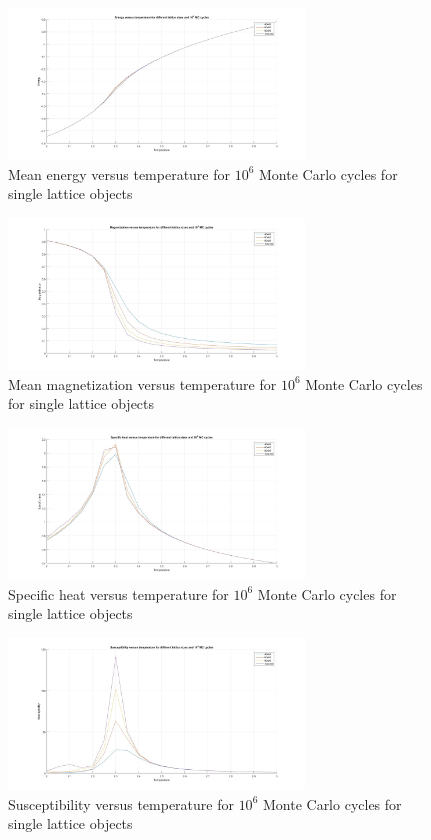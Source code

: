 \documentclass[10pt,a4paper]{article}
\begin{document}
\begin{figure}[H]
\centerline{
\includegraphics[width=0.7\textwidth]{energyVSt}
}
\caption{Mean energy versus temperature for $10^6$ Monte Carlo cycles for single lattice objects}
\label{fig:energyVSt}
\end{figure}

\begin{figure}[H]
\centerline{
\includegraphics[width=0.7\textwidth]{magnetizationVSt}
}
\caption{Mean magnetization versus temperature for $10^6$ Monte Carlo cycles for single lattice objects}
\label{fig:magVSt}
\end{figure}

\begin{figure}[H]
\centerline{
\includegraphics[width=0.7\textwidth]{heatVSt}
}
\caption{Specific heat versus temperature for $10^6$ Monte Carlo cycles for single lattice objects}
\label{fig:heatVSt}
\end{figure}

\begin{figure}[H]
\centerline{
\includegraphics[width=0.7\textwidth]{susceptibilityVSt}
}
\caption{Susceptibility versus temperature for $10^6$ Monte Carlo cycles for single lattice objects}
\label{fig:susVSt}
\end{figure}
\end{document}
